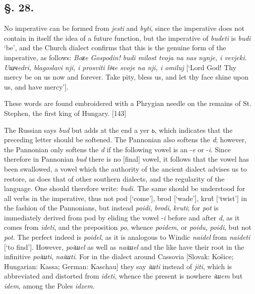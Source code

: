 \subsection*{\hspace*{\fill}§. 28.\hspace*{\fill}}

No imperative can be formed from \textit{jesti} and \textit{byti}, since the imperative does not contain in itself the idea of a future function, but the imperative of \textit{budeti} is \textit{budi} ‘be’, and the Church dialect confirms that this is the genuine form of the imperative, as follows: \textit{Boƶe Gospodin! budi milost tvoja na nas nynje, i vevjeki. Uшчedri, blagoslavi nji, i prosviti liчe svoje na nji, i omiluj} [‘Lord God! Thy mercy be on us now and forever. Take pity, bless us, and let thy face shine upon us, and have mercy’].

These words are found embroidered with a Phrygian needle on the remains of St. Stephen, the first king of Hungary. [143]

The Russian says \textit{bud} but adds at the end a yer \textit{ь}, which indicates that the preceding letter should be softened. The Pannonian also softens the \textit{d}; however, the Pannonian only softens the \textit{d} if the following vowel is an -\textit{e} or -\textit{i}. Since therefore in Pannonian \textit{bud} there is no [final] vowel, it follows that the vowel has been swallowed, a vowel which the authority of the ancient dialect advises us to restore, as does that of other southern dialects, and the regularity of the language. One should therefore write: \textit{budi}. The same should be understood for all verbs in the imperative, thus not {\Blackletter pod} [‘come’], {\Blackletter brod} [‘wade’], {\Blackletter kru\'t} [‘twist’] in the fashion of the Pannonians, but instead \textit{poidi}, \textit{brodi}, \textit{kruti}; for \textit{pot} is immediately derived from {\Blackletter pod} by eliding the vowel -\textit{i} before and after \textit{d}, as it comes from \textit{ideti}, and the preposition \textit{po}, whence \textit{poidem}, or \textit{poidu}, \textit{poidi}, but not \textit{pot}. The perfect indeed is \textit{poidel}, as it is analogous to Windic \textit{naidel} from \textit{naideti} [‘to find’]. However, \textit{poiшel} as well as \textit{naiшel} and the like have their root in the infinitive \textit{poiшti}, \textit{naiшti}. For in the dialect around Cassovia [Slovak: Košice; Hungarian: Kassa; German: Kaschau] they say \textit{iшti} instead of \textit{jiti}, which is abbreviated and distorted from \textit{ideti}, whence the present is nowhere \textit{iшem} but \textit{idem}, among the Poles \textit{idzem}.

